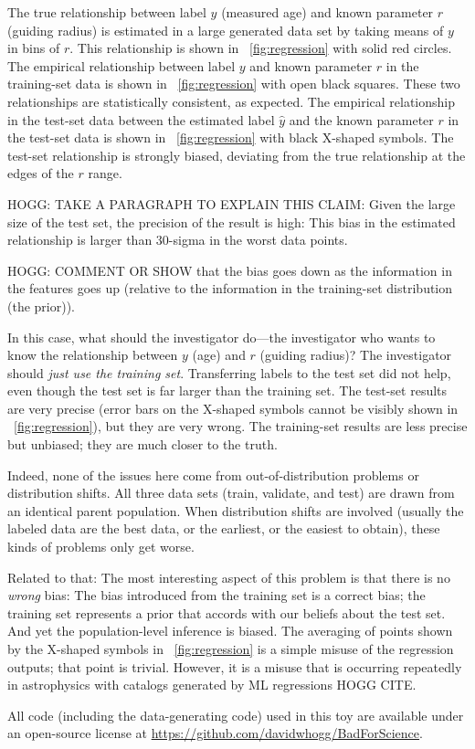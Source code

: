 \documentclass[11pt]{article}
\begin{document}
The true relationship between label $y$ (measured age) and known parameter $r$ (guiding radius) is estimated in a large generated data set by taking means of $y$ in bins of $r$.
This relationship is shown in \figurename~\ref{fig:regression} with solid red circles.
The empirical relationship between label $y$ and known parameter $r$ in the training-set data is shown in \figurename~\ref{fig:regression} with open black squares.
These two relationships are statistically consistent, as expected.
The empirical relationship in the test-set data between the estimated label $\hat{y}$ and the known parameter $r$ in the test-set data is shown in \figurename~\ref{fig:regression} with black X-shaped symbols.
The test-set relationship is strongly biased, deviating from the true relationship at the edges of the $r$ range.

HOGG: TAKE A PARAGRAPH TO EXPLAIN THIS CLAIM: Given the large size of the test set, the precision of the result is high: This bias in the estimated relationship is larger than 30-sigma in the worst data points.

HOGG: COMMENT OR SHOW that the bias goes down as the information in the features goes up (relative to the information in the training-set distribution (the prior)).

In this case, what should the investigator do---the investigator who wants to know the relationship between $y$ (age) and $r$ (guiding radius)?
The investigator should \emph{just use the training set}.
Transferring labels to the test set did not help, even though the test set is far larger than the training set.
The test-set results are very precise (error bars on the X-shaped symbols cannot be visibly shown in \figurename~\ref{fig:regression}), but they are very wrong.
The training-set results are less precise but unbiased; they are much closer to the truth.

Indeed, none of the issues here come from out-of-distribution problems or distribution shifts.
All three data sets (train, validate, and test) are drawn from an identical parent population.
When distribution shifts are involved (usually the labeled data are the best data, or the earliest, or the easiest to obtain), these kinds of problems only get worse.

Related to that: The most interesting aspect of this problem is that there is no \emph{wrong} bias:
The bias introduced from the training set is a correct bias; the training set represents a prior that accords with our beliefs about the test set.
And yet the population-level inference is biased.
The averaging of points shown by the X-shaped symbols in \figurename~\ref{fig:regression} is a simple misuse of the regression outputs; that point is trivial.
However, it is a misuse that is occurring repeatedly in astrophysics with catalogs generated by ML regressions HOGG CITE.

All code (including the data-generating code) used in this toy are available under an open-source license at \url{https://github.com/davidwhogg/BadForScience}.
\end{document}
